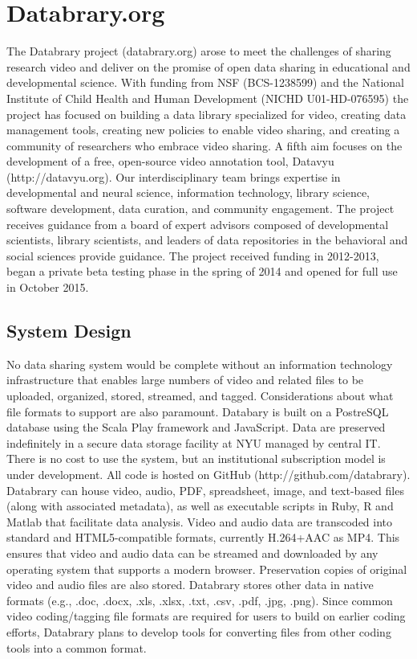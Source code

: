 \documentclass[letterpaper,man,apacite]{apa6}
\begin{document}
\section{Databrary.org}

The Databrary project (databrary.org) arose to meet the challenges of sharing research video and deliver on the promise of open data sharing in educational and developmental science.
With funding from NSF (BCS-1238599) and the National Institute of Child Health and Human Development (NICHD U01-HD-076595) the project has focused on building a data library specialized for video, creating data management tools, creating new policies to enable video sharing, and creating a community of researchers who embrace video sharing.
A fifth aim focuses on the development of a free, open-source video annotation tool, Datavyu (http://datavyu.org).
Our interdisciplinary team brings expertise in developmental and neural science, information technology, library science, software development, data curation, and community engagement. 
The project receives guidance from a board of expert advisors composed of developmental scientists, library scientists, and leaders of data repositories in the behavioral and social sciences provide guidance.
The project received funding in 2012-2013, began a private beta testing phase in the spring of 2014 and opened for full use in October 2015.

\subsection{System Design}

No data sharing system would be complete without an information technology infrastructure that enables large numbers of video and related files to be uploaded, organized, stored, streamed, and tagged.
Considerations about what file formats to support are also paramount.
Databary is built on a PostreSQL database using the Scala Play framework and JavaScript.
Data are preserved indefinitely in a secure data storage facility at NYU managed by central IT.
There is no cost to use the system, but an institutional subscription model is under development.
All code is hosted on GitHub (http://github.com/databrary).
Databrary can house video, audio, PDF, spreadsheet, image, and text-based files (along with associated metadata), as well as executable scripts in Ruby, R and Matlab that facilitate data analysis.
Video and audio data are transcoded into standard and HTML5-compatible formats, currently H.264+AAC as MP4.
This ensures that video and audio data can be streamed and downloaded by any operating system that supports a modern browser.
Preservation copies of original video and audio files are also stored.
Databrary stores other data in native formats (e.g., .doc, .docx, .xls, .xlsx, .txt, .csv, .pdf, .jpg, .png).
Since common video coding/tagging file formats are required for users to build on earlier coding efforts, Databrary plans to develop tools for converting files from other coding tools into a common format.
\end{document}
